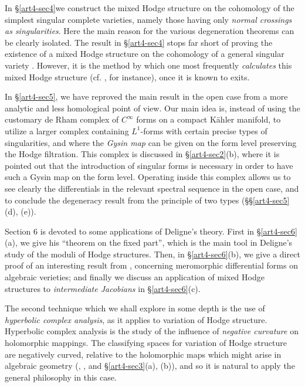 In \S \ref{art4-sec4}\pageoriginale we construct the mixed Hodge structure on the cohomology of the simplest singular complete varieties, namely those having only \textit{normal crossings as singularities}. Here the main reason for the various degeneration theorems can be clearly isolated. The result in \S \ref{art4-sec4} stops far short of proving the existence of a mixed Hodge structure on the cohomology of a general singular variety \cite{art4-key14}. However, it is the method by which one most frequently \textit{calculates} this mixed Hodge structure (cf. \cite{art4-key10}, for instance), once it is known to exits.

In \S \ref{art4-sec5}, we have reproved the main result in the open case \cite{art4-key13} from a more analytic and less homological point of view. Our main idea is, instead of using the customary de Rham complex of $C^\infty$ forms on a compact K\"ahler manifold, to utilize a larger complex containing $L^1$-forms with certain precise types of singularities, and where the \textit{Gysin map} can be given on the form level preserving the Hodge filtration. This complex is discussed in \S\ref{art4-sec2}(b), where it is pointed out that the introduction of singular forms is necessary in order to have such a Gysin map on the form level. Operating inside this complex allows us to see clearly the differentials in the relevant spectral sequence in the open case, and to conclude the degeneracy result from the principle of two types (\S\S\ref{art4-sec5}(d), (e)).

Section 6 is devoted to some applications of Deligne's theory. First in \S \ref{art4-sec6}(a), we give his ``theorem on the fixed part'', which is the main tool in Deligne's study of the moduli of Hodge structures. Then, in \S\ref{art4-sec6}(b), we give a direct proof of an interesting result from \cite{art4-key13}, concerning meromorphic differential forms on algebraic verieties; and finally we discuss an application of mixed Hodge structures to \textit{intermediate Jacobians} in \S \ref{art4-sec6}(c).

The second technique which we shall explore in some depth is the use of \textit{hyperbolic complex analysis}, as it applies to variation of Hodge structure. Hyperbolic complex analysis is the study of the influence of \textit{negative curvature} on holomorphic mappings. The classifying spaces for variation of Hodge structure are negatively curved, relative to the holomorphic maps which might arise in algebraic geometry (\cf \cite{art4-key11}, \cite{art4-key25}, and \S \ref{art4-sec3}(a), (b)), and so it is natural to apply the general philosophy in this case.

